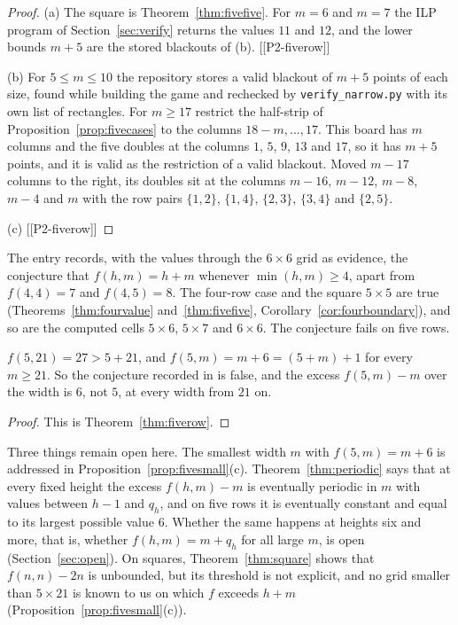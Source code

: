 \begin{proof}
(a) The square is Theorem~\ref{thm:fivefive}. For $m=6$ and $m=7$ the ILP program of
Section~\ref{sec:verify} returns the values $11$ and $12$, and the lower bounds $m+5$ are the
stored blackouts of (b). [[P2-fiverow]]

(b) For $5\le m\le10$ the repository stores a valid blackout of $m+5$ points of each size,
found while building the game and rechecked by \texttt{verify\_narrow.py} with its own list of
rectangles. For $m\ge17$ restrict the half-strip of Proposition~\ref{prop:fivecases} to the
columns $18-m,\dots,17$. This board has $m$ columns and the five doubles at the columns
$1$, $5$, $9$, $13$ and $17$, so it has $m+5$ points, and it is valid as the restriction of a
valid blackout. Moved $m-17$ columns to the right, its doubles sit at the columns $m-16$,
$m-12$, $m-8$, $m-4$ and $m$ with the row pairs $\{1,2\}$, $\{1,4\}$, $\{2,3\}$, $\{3,4\}$ and
$\{2,5\}$.

(c) [[P2-fiverow]]
\end{proof}

The entry  records, with the values through the $6\times6$ grid as evidence,
the conjecture that $f(h,m)=h+m$ whenever $\min(h,m)\ge4$, apart from $f(4,4)=7$ and
$f(4,5)=8$. The four-row case and the square $5\times5$ are true (Theorems~\ref{thm:fourvalue}
and~\ref{thm:fivefive}, Corollary~\ref{cor:fourboundary}), and so are the computed cells
$5\times6$, $5\times7$ and $6\times6$. The conjecture fails on five rows.

\begin{theorem}[the conjecture $f(h,m)=h+m$ fails]\label{thm:refute}
$f(5,21)=27>5+21$, and $f(5,m)=m+6=(5+m)+1$ for every $m\ge21$. So the conjecture recorded in
 is false, and the excess $f(5,m)-m$ over the width is $6$, not $5$, at every
width from $21$ on.
\end{theorem}

\begin{proof}
This is Theorem~\ref{thm:fiverow}.
\end{proof}

Three things remain open here. The smallest width $m$ with $f(5,m)=m+6$ is addressed in
Proposition~\ref{prop:fivesmall}(c). Theorem~\ref{thm:periodic} says that at every fixed
height the excess $f(h,m)-m$ is eventually periodic in $m$ with values between $h-1$ and
$q_h$, and on five rows it is eventually constant and equal to its largest possible value
$6$. Whether the same happens at heights six and more, that is, whether $f(h,m)=m+q_h$ for
all large $m$, is open (Section~\ref{sec:open}). On squares, Theorem~\ref{thm:square} shows
that $f(n,n)-2n$ is unbounded, but its threshold is not explicit, and no grid smaller than
$5\times21$ is known to us on which $f$ exceeds $h+m$ (Proposition~\ref{prop:fivesmall}(c)).
